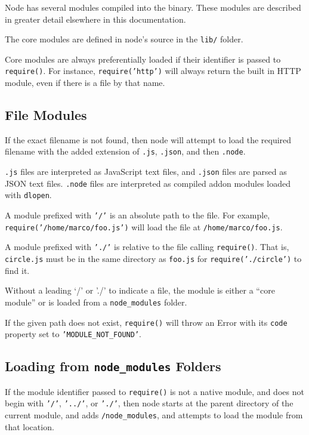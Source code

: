Node has several modules compiled into the binary. These modules are
described in greater detail elsewhere in this documentation.

The core modules are defined in node's source in the \texttt{lib/}
folder.

Core modules are always preferentially loaded if their identifier is
passed to \texttt{require()}. For instance, \texttt{require('http')}
will always return the built in HTTP module, even if there is a file by
that name.

\subsection{File Modules}

If the exact filename is not found, then node will attempt to load the
required filename with the added extension of \texttt{.js},
\texttt{.json}, and then \texttt{.node}.

\texttt{.js} files are interpreted as JavaScript text files, and
\texttt{.json} files are parsed as JSON text files. \texttt{.node} files
are interpreted as compiled addon modules loaded with \texttt{dlopen}.

A module prefixed with \texttt{'/'} is an absolute path to the file. For
example, \texttt{require('/home/marco/foo.js')} will load the file at
\texttt{/home/marco/foo.js}.

A module prefixed with \texttt{'./'} is relative to the file calling
\texttt{require()}. That is, \texttt{circle.js} must be in the same
directory as \texttt{foo.js} for \texttt{require('./circle')} to find
it.

Without a leading `/' or './' to indicate a file, the module is either a
``core module'' or is loaded from a \texttt{node\_modules} folder.

If the given path does not exist, \texttt{require()} will throw an Error
with its \texttt{code} property set to \texttt{'MODULE\_NOT\_FOUND'}.

\subsection{Loading from \texttt{node\_modules} Folders}

If the module identifier passed to \texttt{require()} is not a native
module, and does not begin with \texttt{'/'}, \texttt{'../'}, or
\texttt{'./'}, then node starts at the parent directory of the current
module, and adds \texttt{/node\_modules}, and attempts to load the
module from that location.

